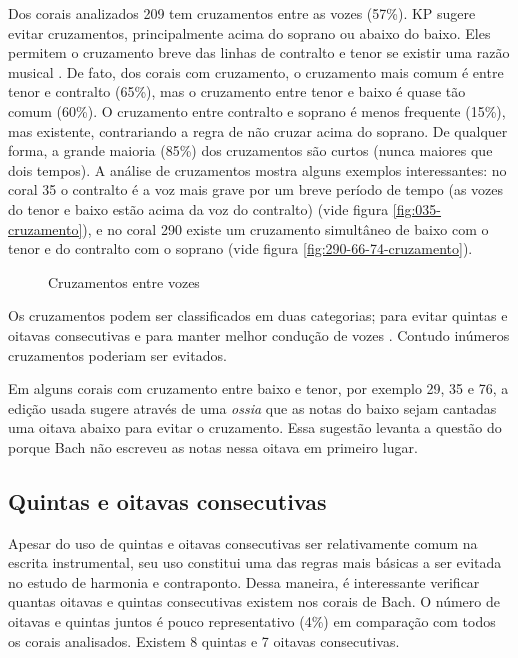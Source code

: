 Dos corais analizados 209 tem cruzamentos entre as vozes (57\%). KP
sugere evitar cruzamentos, principalmente acima do soprano ou abaixo
do baixo. Eles permitem o cruzamento breve das linhas de contralto e
tenor se existir uma razão musical \cite[p. 79]{kostka.ea00:tonal}. De
fato, dos corais com cruzamento, o cruzamento mais comum é entre tenor
e contralto (65\%), mas o cruzamento entre tenor e baixo é quase tão
comum (60\%). O cruzamento entre contralto e soprano é menos frequente
(15\%), mas existente, contrariando a regra de não cruzar acima do
soprano. De qualquer forma, a grande maioria (85\%) dos cruzamentos
são curtos (nunca maiores que dois tempos). A análise de cruzamentos
mostra alguns exemplos interessantes: no coral 35 o contralto é a voz
mais grave por um breve período de tempo (as vozes do tenor e baixo
estão acima da voz do contralto) (vide figura
\ref{fig:035-cruzamento}), e no coral 290 existe um cruzamento
simultâneo de baixo com o tenor e do contralto com o soprano (vide
figura \ref{fig:290-66-74-cruzamento}).

\begin{figure}
  \centering
  \caption{Cruzamentos entre vozes}
  \label{fig:coral-003}
\end{figure}

Os cruzamentos podem ser classificados em duas categorias; para evitar
quintas e oitavas consecutivas   e para manter melhor condução de vozes
. Contudo inúmeros cruzamentos poderiam ser evitados.

Em alguns corais com cruzamento entre baixo e tenor, por exemplo 29,
35 e 76, a edição usada sugere através de uma \textit{ossia} que as
notas do baixo sejam cantadas uma oitava abaixo para evitar o
cruzamento. Essa sugestão levanta a questão do porque Bach não
escreveu as notas nessa oitava em primeiro lugar.

\subsection{Quintas e oitavas consecutivas}
\label{sec:quintas-e-oitavas}

Apesar do uso de quintas e oitavas consecutivas ser relativamente
comum na escrita instrumental, seu uso constitui uma das regras mais
básicas a ser evitada no estudo de harmonia e contraponto. Dessa
maneira, é interessante verificar quantas oitavas e quintas
consecutivas existem nos corais de Bach. O número de oitavas e quintas
juntos é pouco representativo (4\%) em comparação com todos os corais
analisados. Existem 8 quintas e 7 oitavas consecutivas.

